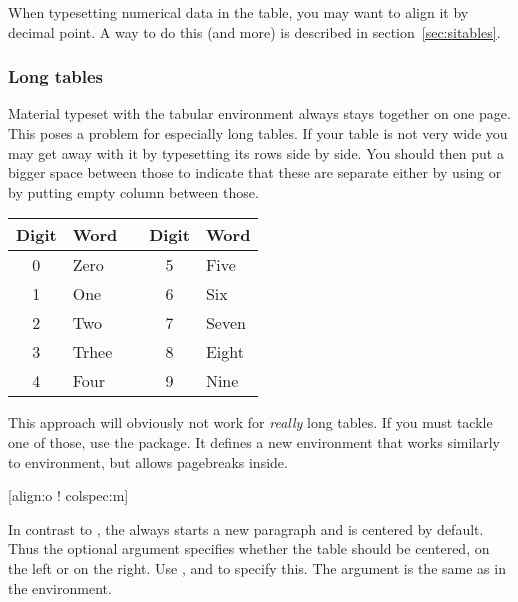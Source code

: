 When typesetting numerical data in the table, you may want to align it by
decimal point. A way to do this (and more) is described in
section~\ref{sec:sitables}.

\subsubsection{Long tables}

Material typeset with the tabular environment always stays together on one
page. This poses a problem for especially long tables. If your table is not
very wide you may get away with it by typesetting its rows side by side. You
should then put a bigger space between those to indicate that these are
separate either by using  or by putting empty column between
those.
\begin{example}[examplewidth=0.4\linewidth]
\begin{tabular}{@{}cllcl@{}}
  \toprule
  Digit & Word  && Digit & Word  \\
  \midrule
  0     & Zero  && 5     & Five  \\
  1     & One   && 6     & Six   \\
  2     & Two   && 7     & Seven \\
  3     & Trhee && 8     & Eight \\
  4     & Four  && 9     & Nine  \\
  \bottomrule
\end{tabular}
\end{example}

This approach will obviously not work for \emph{really} long tables. If you
must tackle one of those, use the  package. It defines a new
 environment that works similarly to  environment,
but allows pagebreaks inside.

\begin{lscommand}
  [align:o ! colspec:m]
\end{lscommand}
In contrast to , the  always starts a new paragraph
and is centered by default. Thus the optional argument  specifies
whether the table should be centered, on the left or on the right. Use
,  and  to specify this. The  argument
is the same as in the  environment.

